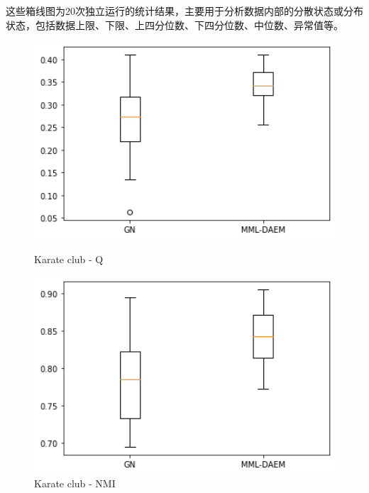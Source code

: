 \documentclass[a4paper,12pt,openany,oneside,utf-8]{ctexbook}
\begin{document}
	这些箱线图为20次独立运行的统计结果，主要用于分析数据内部的分散状态或分布状态，包括数据上限、下限、上四分位数、下四分位数、中位数、异常值等。
	\begin{figure}[htp]
    \centering
    \begin{minipage}[t]{0.49\textwidth}
        \centering
        \includegraphics[width=1\textwidth]{figure/karate-q.png}
        \caption{Karate club - Q}
        \label{f13}
    \end{minipage}
    \begin{minipage}[t]{0.49\textwidth}
        \centering
        \includegraphics[width=1\textwidth]{figure/karate-nmi.png}
        \caption{Karate club - NMI}
        \label{f14}
        \end{minipage}
    \end{figure}
    
\end{document}
